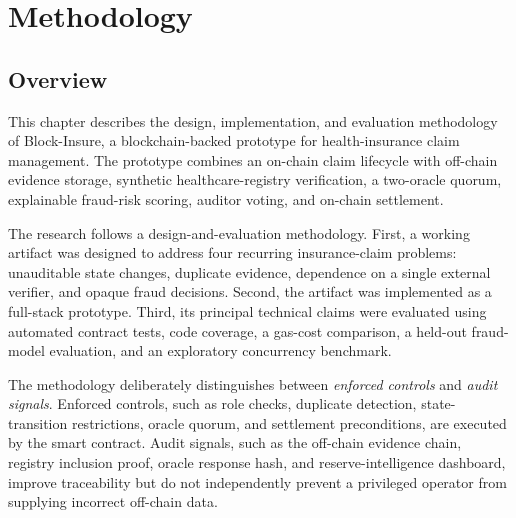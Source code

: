 \chapter{Methodology}
\label{chap:methodology}

\section{Overview}
\label{sec:methodology_overview}

This chapter describes the design, implementation, and evaluation methodology of
Block-Insure, a blockchain-backed prototype for health-insurance claim
management. The prototype combines an on-chain claim lifecycle with off-chain
evidence storage, synthetic healthcare-registry verification, a two-oracle
quorum, explainable fraud-risk scoring, auditor voting, and on-chain settlement.

The research follows a design-and-evaluation methodology. First, a working
artifact was designed to address four recurring insurance-claim problems:
unauditable state changes, duplicate evidence, dependence on a single external
verifier, and opaque fraud decisions. Second, the artifact was implemented as a
full-stack prototype. Third, its principal technical claims were evaluated using
automated contract tests, code coverage, a gas-cost comparison, a held-out
fraud-model evaluation, and an exploratory concurrency benchmark.

The methodology deliberately distinguishes between \emph{enforced controls} and
\emph{audit signals}. Enforced controls, such as role checks, duplicate
detection, state-transition restrictions, oracle quorum, and settlement
preconditions, are executed by the smart contract. Audit signals, such as the
off-chain evidence chain, registry inclusion proof, oracle response hash, and
reserve-intelligence dashboard, improve traceability but do not independently
prevent a privileged operator from supplying incorrect off-chain data.

